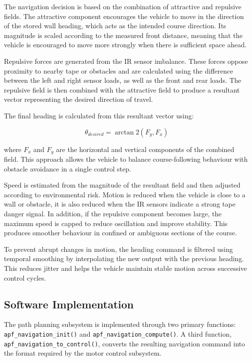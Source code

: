 The navigation decision is based on the combination of attractive and repulsive fields. The attractive component encourages the vehicle to move in the direction of the stored wall heading, which acts as the intended course direction. Its magnitude is scaled according to the measured front distance, meaning that the vehicle is encouraged to move more strongly when there is sufficient space ahead.

Repulsive forces are generated from the IR sensor imbalance. These forces oppose proximity to nearby tape or obstacles and are calculated using the difference between the left and right sensor loads, as well as the front and rear loads. The repulsive field is then combined with the attractive field to produce a resultant vector representing the desired direction of travel.

The final heading is calculated from this resultant vector using:

\[\theta_{desired} = \arctan2(F_y, F_x)\]

where $F_x$ and $F_y$ are the horizontal and vertical components of the combined field. This approach allows the vehicle to balance course-following behaviour with obstacle avoidance in a single control step.

Speed is estimated from the magnitude of the resultant field and then adjusted according to environmental risk. Motion is reduced when the vehicle is close to a wall or obstacle, it is also reduced when the IR sensors indicate a strong tape danger signal. In addition, if the repulsive component becomes large, the maximum speed is capped to reduce oscillation and improve stability. This produces smoother behaviour in confined or ambiguous sections of the course.

To prevent abrupt changes in motion, the heading command is filtered using temporal smoothing by interpolating the new output with the previous heading. This reduces jitter and helps the vehicle maintain stable motion across successive control cycles.

\subsection{Software Implementation}

The path planning subsystem is implemented through two primary functions: \texttt{apf\_navigation\_init()} and \texttt{apf\_navigation\_compute()}. A third function, \texttt{apf\_navigation\_to\_control()}, converts the resulting navigation command into the format required by the motor control subsystem.

